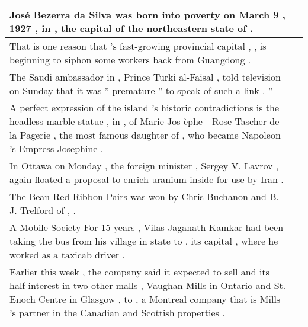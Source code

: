\begin{table}
\begin{tabular}{p{} P{1,4cm} }
\hline
{} {José Bezerra da Silva was born into poverty on March 9 , 1927 , in \underline{} , the capital of the northeastern state of \underline{} .} &    \\ 
\hline
{} {That is one reason that \underline{} 's fast-growing provincial capital , \underline{} , is beginning to siphon some workers back from Guangdong .} &    \\ 
\hline
{} {The Saudi ambassador in \underline{} , Prince Turki al-Faisal , told \underline{} television on Sunday that it was '' premature '' to speak of such a link . ''} &    \\ 
\hline
{} {A perfect expression of the island 's historic contradictions is the headless marble statue , in \underline{} , of Marie-Jos èphe - Rose Tascher de la Pagerie , the most famous daughter of \underline{} , who became Napoleon 's Empress Josephine .} &    \\ 
\hline
{} {In Ottawa on Monday , the \underline{} foreign minister , Sergey V. Lavrov , again floated a proposal to enrich uranium inside \underline{} for use by Iran .} &    \\ 
\hline
{} {The Bean Red Ribbon Pairs was won by Chris Buchanon and B. J. Trelford of \underline{} , \underline{} .} &    \\ 
\hline
{} {A Mobile Society For 15 years , Vilas Jaganath Kamkar had been taking the bus from his village in \underline{} state to \underline{} , its capital , where he worked as a taxicab driver .} &    \\ 
\hline
{} {Earlier this week , the company said it expected to sell \underline{} and its half-interest in two other malls , Vaughan Mills in Ontario and St. Enoch Centre in Glasgow , to \underline{} , a Montreal company that is Mills 's partner in the Canadian and Scottish properties .} &    \\ 

\end{tabular}
\end{table}
